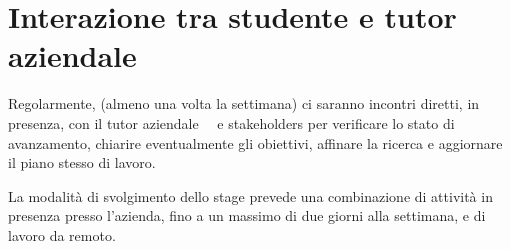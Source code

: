 \section*{Interazione tra studente e tutor aziendale}

Regolarmente, (almeno una volta la settimana) ci saranno incontri diretti, in presenza, con il tutor aziendale \nomeTutorAziendale\ \cognomeTutorAziendale\ e stakeholders per verificare lo stato di avanzamento, chiarire eventualmente gli obiettivi, affinare la ricerca e aggiornare il piano stesso di lavoro.

La modalità di svolgimento dello stage prevede una combinazione di attività in presenza presso l'azienda, fino a un massimo di due giorni alla settimana, e di lavoro da remoto.